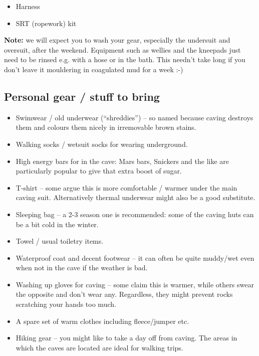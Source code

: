 \documentclass[a4paper,11pt]{article}
\begin{document}
\begin{itemize}
\item Harness
\item SRT (ropework) kit
\end{itemize}

{\bf Note:} we will expect you to wash your gear, especially the undersuit and
oversuit, after the weekend.  Equipment such as wellies and the
kneepads just need to be rinsed e.g. with a hose or in the bath.  This needn't
take long if you don't leave it mouldering in coagulated mud for a week :-)

\newpage

\subsection*{Personal gear / stuff to bring}

\begin{itemize}

\item Swimwear / old underwear (``shreddies'') -- so named because caving destroys
them and colours them nicely in irremovable brown stains. 

\item Walking socks / wetsuit socks for wearing underground.

\item High energy bars for in the cave: Mars bars, Snickers and the like are
particularly popular to give that extra boost of sugar.

\item T-shirt -- some argue this is more comfortable / warmer under the main caving
suit.  Alternatively thermal underwear might also be a good substitute.

\item Sleeping bag -- a 2-3 season one is recommended: some of the caving huts can be a
bit cold in the winter.

\item Towel / usual toiletry items.

\item Waterproof coat and decent footwear -- it can often be quite muddy/wet even
when not in the cave if the weather is bad.

\item Washing up gloves for caving -- some claim this is warmer, while
others swear the opposite and don't wear any.  Regardless, they might prevent rocks
scratching your hands too much.

\item A spare set of warm clothes including fleece/jumper etc.

\item Hiking gear -- you might like to take a day off from caving.  The
areas in which the caves are located are ideal for walking trips.
\end{itemize}
\end{document}
